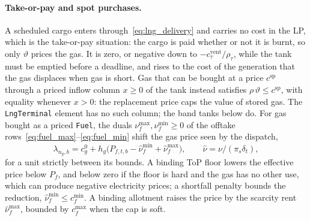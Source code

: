 \paragraph{Take-or-pay and spot purchases.}
A scheduled cargo enters through~\eqref{eq:lng_delivery} and carries no
cost in the LP, which is the take-or-pay situation: the cargo is paid
whether or not it is burnt, so only $\vartheta$ prices the gas.  It is
zero, or negative down to $-c^{\mathrm{vent}}_\tau/\rho_\tau$, while
the tank must be emptied before a deadline, and
rises to the cost of the generation that the gas displaces when gas is
short.  Gas that can be bought at a price $c^{\mathrm{sp}}$ through a
priced inflow column $x \geq 0$ of the tank instead satisfies
$\rho\,\vartheta \leq c^{\mathrm{sp}}$, with equality whenever
$x > 0$: the replacement price caps the value of stored gas.  The
\texttt{LngTerminal} element has no such column; the band tanks below
do.  For gas bought as a priced \texttt{Fuel}, the duals
$\nu^{\max}_f, \nu^{\min}_f \geq 0$ of the offtake
rows~\eqref{eq:fuel_max}--\eqref{eq:fuel_min} shift the gas price seen
by the dispatch,
\begin{equation}
\label{eq:fuel_price}
\lambda_{n_g,b} = c^0_g + h_g\bigl(P_{f,t,b}
  - \hat\nu^{\min}_f + \hat\nu^{\max}_f\bigr),
\qquad \hat\nu = \nu/(\pi_s\delta_t),
\end{equation}
for a unit strictly between its bounds.  A binding ToP floor lowers the
effective price below $P_f$, and below zero if the floor is hard and
the gas has no other use, which can produce negative electricity
prices; a shortfall penalty bounds the reduction,
$\hat\nu^{\min}_f \leq c^{\min}_f$.  A binding allotment raises the
price by the scarcity rent $\hat\nu^{\max}_f$, bounded by $c^{\max}_f$
when the cap is soft.

